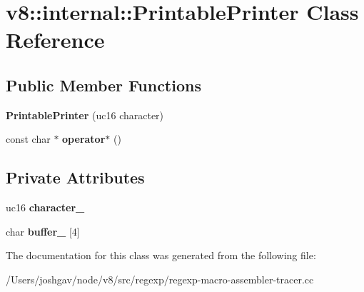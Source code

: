 \hypertarget{classv8_1_1internal_1_1_printable_printer}{}\section{v8\+:\+:internal\+:\+:Printable\+Printer Class Reference}
\label{classv8_1_1internal_1_1_printable_printer}
\subsection*{Public Member Functions}
\begin{DoxyCompactItemize}
\item 
{\bfseries Printable\+Printer} (uc16 character)\hypertarget{classv8_1_1internal_1_1_printable_printer_a7b46fedda0d89f439869b2e2f7358ded}{}\label{classv8_1_1internal_1_1_printable_printer_a7b46fedda0d89f439869b2e2f7358ded}

\item 
const char $\ast$ {\bfseries operator$\ast$} ()\hypertarget{classv8_1_1internal_1_1_printable_printer_a07570a64d144f3b2ec80c07ee23ed3c5}{}\label{classv8_1_1internal_1_1_printable_printer_a07570a64d144f3b2ec80c07ee23ed3c5}

\end{DoxyCompactItemize}
\subsection*{Private Attributes}
\begin{DoxyCompactItemize}
\item 
uc16 {\bfseries character\+\_\+}\hypertarget{classv8_1_1internal_1_1_printable_printer_adde027221a5ba73503189bf7b39fbaa0}{}\label{classv8_1_1internal_1_1_printable_printer_adde027221a5ba73503189bf7b39fbaa0}

\item 
char {\bfseries buffer\+\_\+} \mbox{[}4\mbox{]}\hypertarget{classv8_1_1internal_1_1_printable_printer_a3fbc300eb5fb1cd7136b6dd6fe2e6ca3}{}\label{classv8_1_1internal_1_1_printable_printer_a3fbc300eb5fb1cd7136b6dd6fe2e6ca3}

\end{DoxyCompactItemize}


The documentation for this class was generated from the following file\+:\begin{DoxyCompactItemize}
\item 
/\+Users/joshgav/node/v8/src/regexp/regexp-\/macro-\/assembler-\/tracer.\+cc\end{DoxyCompactItemize}
